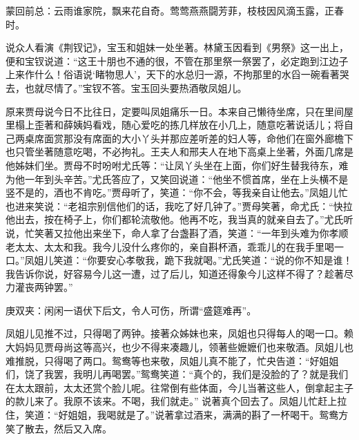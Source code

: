 

\begin{parag}
    \begin{note}蒙回前总：云雨谁家院，飘来花自奇。莺莺燕燕闘芳菲，枝枝因风滴玉露，正春时。\end{note}
\end{parag}


\begin{parag}
    说众人看演《荆钗记》，宝玉和姐妹一处坐著。林黛玉因看到《男祭》这一出上，便和宝钗说道：“这王十朋也不通的很，不管在那里祭一祭罢了，必定跑到江边子上来作什么！俗语说‘睹物思人’，天下的水总归一源，不拘那里的水舀一碗看著哭去，也就尽情了。”宝钗不答。宝玉回头要热酒敬凤姐儿。
\end{parag}


\begin{parag}
    原来贾母说今日不比往日，定要叫凤姐痛乐一日。本来自己懒待坐席，只在里间屋里榻上歪著和薛姨妈看戏，随心爱吃的拣几样放在小几上，随意吃著说话儿；将自己两桌席面赏那没有席面的大小丫头并那应差听差的妇人等，命他们在窗外廊檐下也只管坐著随意吃喝，不必拘礼。王夫人和邢夫人在地下高桌上坐著，外面几席是他姊妹们坐。贾母不时吩咐尤氏等：“让凤丫头坐在上面，你们好生替我待东，难为他一年到头辛苦。”尤氏答应了，又笑回说道：“他坐不惯首席，坐在上头横不是竖不是的，酒也不肯吃。”贾母听了，笑道：“你不会，等我亲自让他去。”凤姐儿忙也进来笑说：“老祖宗别信他们的话，我吃了好几钟了。”贾母笑著，命尤氏：“快拉他出去，按在椅子上，你们都轮流敬他。他再不吃，我当真的就亲自去了。”尤氏听说，忙笑著又拉他出来坐下，命人拿了台盏斟了酒，笑道：“一年到头难为你孝顺老太太、太太和我。我今儿没什么疼你的，亲自斟杯酒，乖乖儿的在我手里喝一口。”凤姐儿笑道：“你要安心孝敬我，跪下我就喝。”尤氏笑道：“说的你不知是谁！我告诉你说，好容易今儿这一遭，过了后儿，知道还得象今儿这样不得了？趁著尽力灌丧两钟罢。”\begin{note}庚双夹：闲闲一语伏下后文，令人可伤，所谓“盛筵难再”。\end{note}凤姐儿见推不过，只得喝了两钟。接著众姊妹也来，凤姐也只得每人的喝一口。赖大妈妈见贾母尚这等高兴，也少不得来凑趣儿，领著些嬷嬷们也来敬酒。凤姐儿也难推脱，只得喝了两口。鸳鸯等也来敬，凤姐儿真不能了，忙央告道：“好姐姐们，饶了我罢，我明儿再喝罢。”鸳鸯笑道：“真个的，我们是没脸的了？就是我们在太太跟前，太太还赏个脸儿呢。往常倒有些体面，今儿当著这些人，倒拿起主子的款儿来了。我原不该来。不喝，我们就走。” 说著真个回去了。凤姐儿忙赶上拉住，笑道：“好姐姐，我喝就是了。”说著拿过酒来，满满的斟了一杯喝干。鸳鸯方笑了散去，然后又入席。
\end{parag}


